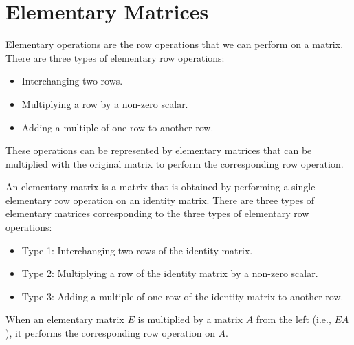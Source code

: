 \section{Elementary Matrices}
Elementary operations are the row operations that we can perform on a matrix. There are three types of elementary row operations:
\begin{itemize}[itemsep=1pt,label=$\circ$]
    \item Interchanging two rows.
    \item Multiplying a row by a non-zero scalar.
    \item Adding a multiple of one row to another row.
\end{itemize}
These operations can be represented by elementary matrices that can be multiplied with the original matrix to perform the corresponding row operation.
\begin{definition}
    An elementary matrix is a matrix that is obtained by performing a single elementary row operation on an identity matrix. There are three types of elementary matrices corresponding to the three types of elementary row operations:
    \begin{itemize}[itemsep=1pt,label=$\circ$]
        \item Type 1: Interchanging two rows of the identity matrix.
        \item Type 2: Multiplying a row of the identity matrix by a non-zero scalar.
        \item Type 3: Adding a multiple of one row of the identity matrix to another row.
    \end{itemize}
    When an elementary matrix \( E \) is multiplied by a matrix \( A \) from the left (i.e., \( EA \)), it performs the corresponding row operation on \( A \).
\end{definition}
